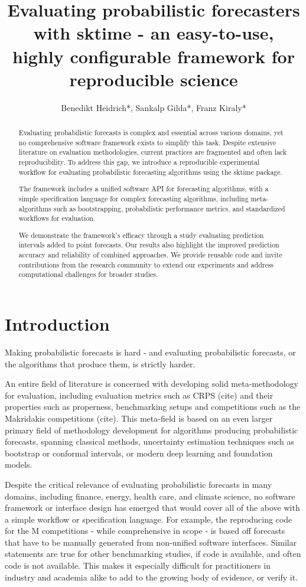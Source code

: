 \documentclass{article}
\title{Evaluating probabilistic forecasters with sktime - an easy-to-use, highly configurable framework for reproducible science}
\author{Benedikt Heidrich*, Sankalp Gilda*, Franz Kiraly*}
\begin{document}
\maketitle

\begin{abstract}
Evaluating probabilistic forecasts is complex and essential across various domains, yet no comprehensive software framework exists to simplify this task. Despite extensive literature on evaluation methodologies, current practices are fragmented and often lack reproducibility. To address this gap, we introduce a reproducible experimental workflow for evaluating probabilistic forecasting algorithms using the sktime package.

The framework includes a unified software API for forecasting algorithms, with a simple specification language for complex forecasting algorithms, including meta-algorithms such as bootstrapping, probabilistic performance metrics, and standardized workflows for evaluation.

We demonstrate the framework's efficacy through a study evaluating prediction intervals added to point forecasts. Our results also highlight the improved prediction accuracy and reliability of combined approaches. We provide reusable code and invite contributions from the research community to extend our experiments and address computational challenges for broader studies.
\end{abstract}

\section{Introduction}

Making probabilistic forecasts is hard - and evaluating probabilistic forecasts, or the algorithms that produce them, is strictly harder.

An entire field of literature is concerned with developing solid meta-methodology for evaluation, including evaluation metrics such as CRPS (cite) and their properties such as properness, benchmarking setups and competitions such as the Makridakis competitions (cite). This meta-field is based on an even larger primary field of methodology development for algorithms producing probabilistic forecasts, spanning classical methods, uncertainty estimation techniques such as bootstrap or conformal intervals, or modern deep learning and foundation models.

Despite the critical relevance of evaluating probabilistic forecasts in many domains, including finance, energy, health care, and climate science, no software framework or interface design has emerged that would cover all of the above with a simple workflow or specification language. For example, the reproducing code for the M competitions - while comprehensive in scope - is based off forecasts that have to be manually generated from non-unified software interfaces. Similar statements are true for other benchmarking studies, if code is available, and often code is not available. This makes it especially difficult for practitioners in industry and academia alike to add to the growing body of evidence, or verify it.
\end{document}
